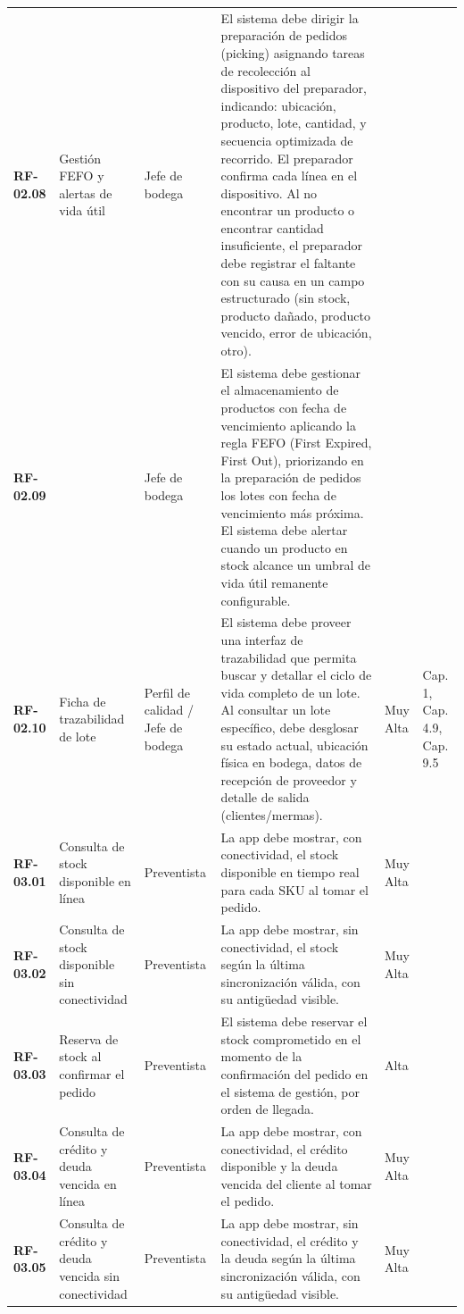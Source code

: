 \begin{longtable}{p{1.7cm} p{2.3cm} p{1.9cm} p{5.0cm} p{1.1cm} p{1.9cm}}
\textbf{RF-02.08} & Gestión FEFO y alertas de vida útil & Jefe de bodega & El sistema debe dirigir la preparación de pedidos (picking) asignando tareas de recolección al dispositivo del preparador, indicando: ubicación, producto, lote, cantidad, y secuencia optimizada de recorrido. El preparador confirma cada línea en el dispositivo. Al no encontrar un producto o encontrar cantidad insuficiente, el preparador debe registrar el faltante con su causa en un campo estructurado (sin stock, producto dañado, producto vencido, error de ubicación, otro). &  &  \\
\textbf{RF-02.09} &  & Jefe de bodega & El sistema debe gestionar el almacenamiento de productos con fecha de vencimiento aplicando la regla FEFO (First Expired, First Out), priorizando en la preparación de pedidos los lotes con fecha de vencimiento más próxima. El sistema debe alertar cuando un producto en stock alcance un umbral de vida útil remanente configurable. &  &  \\
\textbf{RF-02.10} & Ficha de trazabilidad de lote & Perfil de calidad / Jefe de bodega & El sistema debe proveer una interfaz de trazabilidad que permita buscar y detallar el ciclo de vida completo de un lote. Al consultar un lote específico, debe desglosar su estado actual, ubicación física en bodega, datos de recepción de proveedor y detalle de salida (clientes/mermas). & Muy Alta & Cap. 1, Cap. 4.9, Cap. 9.5 \\
\textbf{RF-03.01} & Consulta de stock disponible en línea & Preventista & La app debe mostrar, con conectividad, el stock disponible en tiempo real para cada SKU al tomar el pedido. & Muy Alta &  \\
\textbf{RF-03.02} & Consulta de stock disponible sin conectividad & Preventista & La app debe mostrar, sin conectividad, el stock según la última sincronización válida, con su antigüedad visible. & Muy Alta &  \\
\textbf{RF-03.03} & Reserva de stock al confirmar el pedido & Preventista & El sistema debe reservar el stock comprometido en el momento de la confirmación del pedido en el sistema de gestión, por orden de llegada. & Alta &  \\
\textbf{RF-03.04} & Consulta de crédito y deuda vencida en línea & Preventista & La app debe mostrar, con conectividad, el crédito disponible y la deuda vencida del cliente al tomar el pedido. & Muy Alta &  \\
\textbf{RF-03.05} & Consulta de crédito y deuda vencida sin conectividad & Preventista & La app debe mostrar, sin conectividad, el crédito y la deuda según la última sincronización válida, con su antigüedad visible. & Muy Alta &  \\

\end{longtable}
